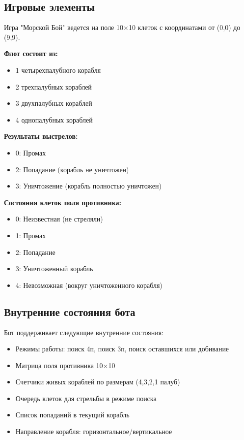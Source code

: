 \documentclass[oneside,a4paper,14pt]{extarticle}
\begin{document}
\subsection*{Игровые элементы}

Игра "Морской Бой" ведется на поле 10×10 клеток с координатами от (0,0) до (9,9).

\textbf{Флот состоит из:}
\begin{itemize}
  \item[$-$] 1 четырехпалубного корабля
  \item[$-$] 2 трехпалубных кораблей
  \item[$-$] 3 двухпалубных кораблей
  \item[$-$] 4 однопалубных кораблей
\end{itemize}

\textbf{Результаты выстрелов:}
\begin{itemize}
  \item[$-$] 0: Промах
  \item[$-$] 2: Попадание (корабль не уничтожен)
  \item[$-$] 3: Уничтожение (корабль полностью уничтожен)
\end{itemize}

\textbf{Состояния клеток поля противника:}
\begin{itemize}
  \item[$-$] 0: Неизвестная (не стреляли)
  \item[$-$] 1: Промах
  \item[$-$] 2: Попадание
  \item[$-$] 3: Уничтоженный корабль
  \item[$-$] 4: Невозможная (вокруг уничтоженного корабля)
\end{itemize}

\subsection*{Внутренние состояния бота}

Бот поддерживает следующие внутренние состояния:

\begin{itemize}
  \item[$-$] Режимы работы: поиск 4п, поиск 3п, поиск оставшихся или добивание
  \item[$-$] Матрица поля противника 10×10
  \item[$-$] Счетчики живых кораблей по размерам (4,3,2,1 палуб)
  \item[$-$] Очередь клеток для стрельбы в режиме поиска
  \item[$-$] Список попаданий в текущий корабль
  \item[$-$] Направление корабля: горизонтальное/вертикальное
\end{itemize}
\end{document}
